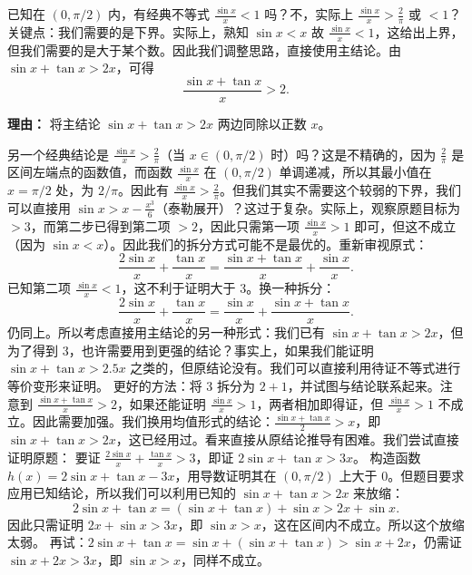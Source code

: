 \begin{examplebox}
\begin{description}[style=nextline, leftmargin=2.8em, labelsep=0.5em, itemsep=0.45em]
    \item[\textbf{第二步（应用已知结论）：}] 已知在 $(0, \pi/2)$ 内，有经典不等式 $\frac{\sin x}{x} < 1$ 吗？不，实际上 $\frac{\sin x}{x} > \frac{2}{\pi}$ 或 $<1$？关键点：我们需要的是下界。实际上，熟知 $\sin x < x$ 故 $\frac{\sin x}{x} < 1$，这给出上界，但我们需要的是大于某个数。因此我们调整思路，直接使用主结论。由 $\sin x + \tan x > 2x$，可得
    \[
    \frac{\sin x + \tan x}{x} > 2.
    \]
    \par\textbf{理由：} 将主结论 $\sin x + \tan x > 2x$ 两边同除以正数 $x$。

    \item[\textbf{第三步（结合另一不等式）：}] 另一个经典结论是 $\frac{\sin x}{x} > \frac{2}{\pi}$（当 $x \in (0,\pi/2)$ 时）吗？这是不精确的，因为 $\frac{2}{\pi}$ 是区间左端点的函数值，而函数 $\frac{\sin x}{x}$ 在 $(0,\pi/2)$ 单调递减，所以其最小值在 $x=\pi/2$ 处，为 $2/\pi$。因此有 $\frac{\sin x}{x} > \frac{2}{\pi}$。但我们其实不需要这个较弱的下界，我们可以直接用 $\sin x > x - \frac{x^3}{6}$（泰勒展开）？这过于复杂。实际上，观察原题目标为 $>3$，而第二步已得到第二项 $>2$，因此只需第一项 $\frac{\sin x}{x} > 1$ 即可，但这不成立（因为 $\sin x < x$）。因此我们的拆分方式可能不是最优的。重新审视原式：
    \[
    \frac{2\sin x}{x} + \frac{\tan x}{x} = \frac{\sin x + \tan x}{x} + \frac{\sin x}{x}.
    \]
    已知第二项 $\frac{\sin x}{x} < 1$，这不利于证明大于 $3$。换一种拆分：
    \[
    \frac{2\sin x}{x} + \frac{\tan x}{x} = \frac{\sin x}{x} + \frac{\sin x + \tan x}{x}.
    \]
    仍同上。所以考虑直接用主结论的另一种形式：我们已有 $\sin x + \tan x > 2x$，但为了得到 $3$，也许需要用到更强的结论？事实上，如果我们能证明 $\sin x + \tan x > 2.5x$ 之类的，但原结论没有。我们可以直接利用待证不等式进行等价变形来证明。
    更好的方法：将 $3$ 拆分为 $2+1$，并试图与结论联系起来。注意到 $\frac{\sin x + \tan x}{x} > 2$，如果还能证明 $\frac{\sin x}{x} > 1$，两者相加即得证，但 $\frac{\sin x}{x} > 1$ 不成立。因此需要加强。我们换用均值形式的结论：$\frac{\sin x + \tan x}{2} > x$，即 $\sin x + \tan x > 2x$，这已经用过。看来直接从原结论推导有困难。我们尝试直接证明原题：
    要证 $\frac{2\sin x}{x} + \frac{\tan x}{x} > 3$，即证 $2\sin x + \tan x > 3x$。
    构造函数 $h(x) = 2\sin x + \tan x - 3x$，用导数证明其在 $(0,\pi/2)$ 上大于 $0$。但题目要求应用已知结论，所以我们可以利用已知的 $\sin x + \tan x > 2x$ 来放缩：
    \[
    2\sin x + \tan x = (\sin x + \tan x) + \sin x > 2x + \sin x.
    \]
    因此只需证明 $2x + \sin x > 3x$，即 $\sin x > x$，这在区间内不成立。所以这个放缩太弱。
    再试：$2\sin x + \tan x = \sin x + (\sin x + \tan x) > \sin x + 2x$，仍需证 $\sin x + 2x > 3x$，即 $\sin x > x$，同样不成立。


\end{description}
\end{examplebox}
